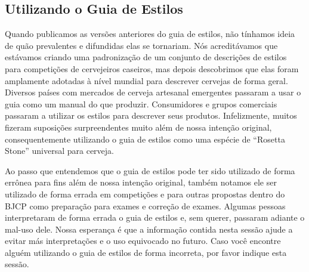 \subsection*{Utilizando o Guia de Estilos}
Quando publicamos as versões anteriores do guia de estilos, não tínhamos ideia de quão prevalentes e difundidas elas se tornariam.  Nós acreditávamos que estávamos criando uma padronização de um conjunto de descrições de estilos para competições de cervejeiros caseiros, mas depois descobrimos que elas foram amplamente adotadas à nível mundial para descrever cervejas de forma geral. Diversos países com mercados de cerveja artesanal emergentes passaram a usar o guia como um manual do que produzir. Consumidores e grupos comerciais passaram a utilizar os estilos para descrever seus produtos. Infelizmente, muitos fizeram suposições surpreendentes muito além de nossa intenção original, consequentemente utilizando o guia de estilos como uma espécie de “Rosetta Stone” universal para cerveja.

Ao passo que entendemos que o guia de estilos pode ter sido utilizado de forma errônea para fins além de nossa intenção original, também notamos ele ser utilizado de forma errada em competições e para outras propostas dentro do BJCP como preparação para exames e correção de exames. Algumas pessoas interpretaram de forma errada o guia de estilos e, sem querer, passaram adiante o mal-uso dele. Nossa esperança é que a informação contida nesta sessão ajude a evitar más interpretações e o uso equivocado no futuro. Caso você encontre alguém utilizando o guia de estilos de forma incorreta, por favor indique esta sessão.

